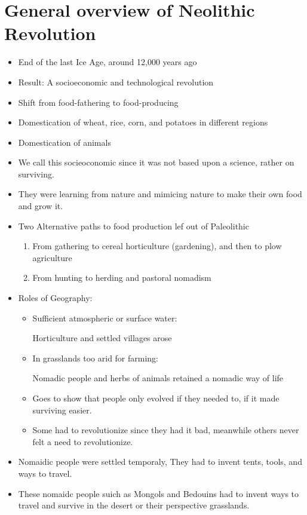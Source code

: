 \documentclass{article}
\begin{document}
\section*{General overview of Neolithic Revolution}
\begin{itemize}
  \item End of the last Ice Age, around 12,000 years ago
  \item Result: A socioeconomic and technological revolution
  \item Shift from food-fathering to food-producing
  \item Domestication of wheat, rice, corn, and potatoes in different regions
  \item Domestication of animals
  \item We call this socieoconomic since it was not based upon a science,
    rather on surviving.
  \item They were learning from nature and mimicing nature
    to make their own food and grow it.
  \item Two Alternative paths to food production lef out of Paleolithic
    \begin{enumerate}
      \item From gathering to cereal horticulture (gardening),
        and then to plow agriculture
      \item From hunting to herding and pastoral nomadism
    \end{enumerate}
  \item Roles of Geography:
    \begin{itemize}
      \item Sufficient atmospheric or surface water:

        Horticulture and settled villages arose
      \item In grasslands too arid for farming:

        Nomadic people and herbs of animals retained a nomadic way of life
      \item Goes to show that people only evolved if they needed to,
        if it made surviving easier.
      \item Some had to revolutionize since they had it bad,
        meanwhile others never felt a need to revolutionize.
    \end{itemize}
  \item Nomaidic people were settled temporaly,
    They had to invent tents, tools, and ways to travel.
  \item These nomaidc people suich as Mongols and Bedouins
    had to invent ways to travel and survive in the desert or their perspective grasslands.
\end{itemize}
\end{document}
